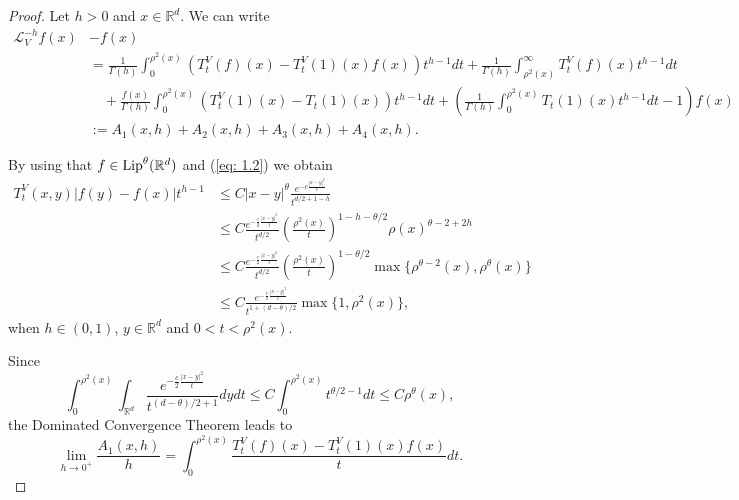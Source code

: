 \documentclass[10pt, a4paper, reqno]{amsart}
\theoremstyle{definition}
\theoremstyle{remark}
\newcommand{\RR}{\mathbb{R}}
\newcommand{\Lip}{\textup{Lip}}
\numberwithin{equation}{section}
\begin{document}
\begin{proof}Let $h>0$ and $x\in \RR^d$. We can write
\begin{align*}
    \mathcal{L}^{-h}_Vf(x)&-f(x)\\
    &=\frac{1}{\Gamma(h)}\int_0^{\rho^2(x)}\left(T_t^V(f)(x)-T_t^V(1)(x)f(x)\right)t^{h-1} dt+\frac{1}{\Gamma(h)}\int_{\rho^2(x)}^\infty T_t^V(f)(x)t^{h-1} dt\\
    &\quad +\frac{f(x)}{\Gamma(h)}\int_0^{\rho^2(x)} \left(T_t^V(1)(x)-T_t(1)(x)\right)t^{h-1}dt+\left(\frac{1}{\Gamma(h)}\int_0^{\rho^2(x)} T_t(1)(x)t^{h-1} dt-1\right)f(x)\\
    &:=A_1(x,h)+A_2(x,h)+A_3(x,h)+A_4(x,h).
\end{align*}

By using that $f\in \Lip^\theta(\RR^d)$ and (\ref{eq: 1.2}) we obtain
\begin{align*}
 T_t^V(x,y)|f(y)-f(x)|t^{h-1}&\le C|x-y|^\theta\frac{e^{-c\frac{|x-y|^2}{t}}}{t^{d/2+1-h}}\\
 &\le C\frac{e^{-\frac c2\frac{|x-y|^2}{t}}}{t^{d/2}}\left(\frac{\rho^2(x)}{t}\right)^{1-h-\theta/2}\rho(x)^{\theta-2+2h}\\
 &\le C\frac{e^{-\frac c2\frac{|x-y|^2}{t}}}{t^{d/2}}\left(\frac{\rho^2(x)}{t}\right)^{1-\theta/2}\max\{\rho^{\theta-2}(x),\rho^{\theta}(x)\}\\
 &\le C\frac{e^{-\frac c2\frac{|x-y|^2}{t}}}{t^{1+(d-\theta)/2}}\max\{1,\rho^2(x)\},
    \end{align*}
when $h\in (0,1)$, $y\in\mathbb{R}^d$ and $0<t<\rho^2(x)$.

Since 
\[
\int_0^{\rho^2(x)}\int_{\mathbb{R}^d}\frac{e^{-\frac c2\frac{|x-y|^2}{t}}}{t^{(d-\theta)/2+1}}dydt\le C\int_0^{\rho^2(x)}t^{\theta/2-1}dt\le C\rho^\theta(x),
\]
the Dominated Convergence Theorem leads to
\[
\lim_{h\to 0^+}\frac{A_1(x,h)}{h}=\int_0^{\rho^2(x)}\frac{T_t^V(f)(x)-T_t^V(1)(x)f(x)}{t}dt.
\]



\end{proof}
\end{document}
